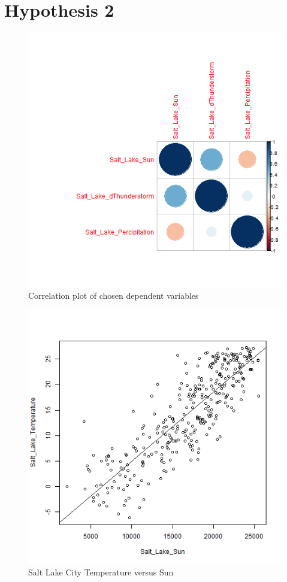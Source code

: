 \documentclass[final]{siamart1116}
\begin{document}
\section{Hypothesis 2}

\begin{figure}
  \centering
  \includegraphics[width=15cm]{../data/img/correlation_plot.PNG}
  \caption{Correlation plot of chosen dependent variables}
  \label{fig:correlation_plot}
\end{figure}

\begin{figure}
  \centering
  \includegraphics[width=15cm]{../data/img/Temp_vs_sun.PNG}
  \caption{Salt Lake City Temperature versus Sun}
  \label{fig:temp_vs_sun}
\end{figure}
\end{document}
